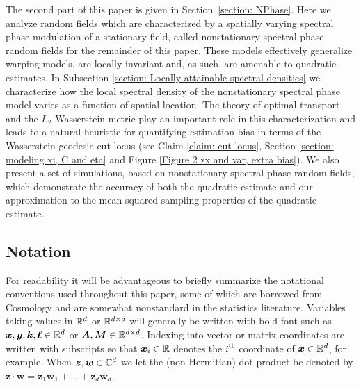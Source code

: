 \documentclass[10pt,noinfoline]{imsart}
\newcommand{\bs}{\boldsymbol}
\begin{document}
The second part of this paper is given in Section~\ref{section: NPhase}. Here we analyze random fields which are characterized by a spatially varying spectral phase modulation of a stationary field, called nonstationary spectral phase random fields for the remainder of this paper. These models effectively generalize warping models, are locally invariant and, as such, are amenable to quadratic estimates. In Subsection \ref{section: Locally attainable spectral densities} we characterize how the local spectral density of the nonstationary spectral phase model varies as a function of spatial location. The theory of optimal transport and the $L_2$-Wasserstein metric play an important role in this characterization and leads to a natural heuristic for quantifying estimation bias in terms of the Wasserstein geodesic cut locus (see Claim \ref{claim: cut locus}, Section \ref{section: modeling xi, C and eta} and Figure \ref{Figure 2 zx and var, extra bias}). We also present a set of simulations, based on nonstationary spectral phase random fields, which demonstrate the accuracy of both the quadratic estimate and our approximation to the mean squared sampling properties of the quadratic estimate. 





\subsection{Notation}

For readability it will be advantageous to briefly summarize the notational conventions used throughout this paper, some of which are borrowed from Cosmology and are somewhat nonstandard in the statistics literature.
Variables taking values in $\Bbb R^d$ or $\Bbb R^{d\times d}$ will generally be written with bold font such as $\bs x, \bs y, \bs k,\bs \ell\in \Bbb R^d$ or $\bs A,\bs M \in \Bbb R^{d\times d}$. Indexing into vector or matrix coordinates are written with subscripts so that $\bs x_i\in\Bbb R$ denotes the $i^{\text{th}}$ coordinate of $\bs x\in\Bbb R^d$, for example. When $\bs z, \bs w\in\Bbb C^d$ we let the (non-Hermitian) dot product  be denoted by $\bs z \cdot \bs w = \bs z_1 \bs w_1 + \ldots + \bs z_d \bs w_d$.
\end{document}
